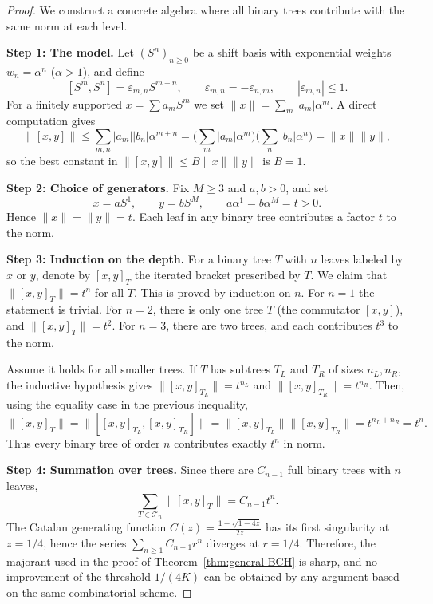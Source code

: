 \documentclass[11pt]{amsart}
\numberwithin{equation}{section}
\theoremstyle{remark}
\begin{document}
\begin{proof}
We construct a concrete algebra where all binary trees contribute
with the same norm at each level.

\smallskip
\noindent
\textbf{Step 1: The model.}
Let $(S^n)_{n\ge0}$ be a shift basis with exponential weights
$w_n=\alpha^n$ ($\alpha>1$), and define
\[
[S^m,S^n]=\varepsilon_{m,n}S^{m+n},
\qquad
\varepsilon_{m,n}=-\varepsilon_{n,m},
\qquad
|\varepsilon_{m,n}|\le1.
\]
For a finitely supported $x=\sum a_mS^m$ we set
$\|x\|=\sum_m|a_m|\alpha^m$.
A direct computation gives
\[
\|[x,y]\|
\le\sum_{m,n}|a_m||b_n|\alpha^{m+n}
=\Big(\sum_m|a_m|\alpha^m\Big)\Big(\sum_n|b_n|\alpha^n\Big)
=\|x\|\|y\|,
\]
so the best constant in $\|[x,y]\|\le B\|x\|\|y\|$ is $B=1$.

\smallskip
\noindent
\textbf{Step 2: Choice of generators.}
Fix $M\ge3$ and $a,b>0$, and set
\[
x=aS^{1},\qquad y=bS^{M},
\qquad a\alpha^1=b\alpha^M=t>0.
\]
Hence $\|x\|=\|y\|=t$.
Each leaf in any binary tree contributes a factor $t$ to the norm.

\smallskip
\noindent
\textbf{Step 3: Induction on the depth.}
For a binary tree $T$ with $n$ leaves labeled by $x$ or $y$,
denote by $[x,y]_T$ the iterated bracket prescribed by $T$.
We claim that $\|[x,y]_T\|=t^n$ for all $T$.
This is proved by induction on $n$.
For $n=1$ the statement is trivial.
For $n=2$, there is only one tree $T$ (the commutator $[x, y]$), and $\|[x, y]_T\| = t^2$. For $n=3$, there are two trees, and each contributes $t^3$ to the norm.

Assume it holds for all smaller trees.
If $T$ has subtrees $T_L$ and $T_R$ of sizes $n_L,n_R$,
the inductive hypothesis gives
$\|[x,y]_{T_L}\|=t^{n_L}$ and
$\|[x,y]_{T_R}\|=t^{n_R}$.
Then, using the equality case in the previous inequality,
\[
\|[x,y]_T\|=\|[[x,y]_{T_L},[x,y]_{T_R}]\|
=\|[x,y]_{T_L}\|\|[x,y]_{T_R}\|
=t^{n_L+n_R}=t^n.
\]
Thus every binary tree of order $n$ contributes
exactly $t^n$ in norm.

\smallskip
\noindent
\textbf{Step 4: Summation over trees.}
Since there are $C_{n-1}$ full binary trees with $n$ leaves,
\[
\sum_{T\in\mathcal T_n}\|[x,y]_T\|
=C_{n-1}t^n.
\]
The Catalan generating function
$C(z)=\frac{1-\sqrt{1-4z}}{2z}$
has its first singularity at $z=1/4$,
hence the series $\sum_{n\ge1}C_{n-1}r^n$
diverges at $r=1/4$.
Therefore, the majorant used in the proof of
Theorem~\ref{thm:general-BCH} is sharp,
and no improvement of the threshold $1/(4K)$
can be obtained by any argument based on the same combinatorial scheme.
\end{proof}
\end{document}
